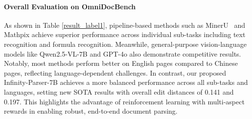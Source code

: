 \paragraph{Overall Evaluation on OmniDocBench}
As shown in Table \ref{result_label1}, pipeline-based methods such as MinerU~\citep{MinerU} and Mathpix achieve superior performance across individual sub-tasks including text recognition and formula recognition. Meanwhile, general-purpose vision-language models like Qwen2.5-VL-7B and GPT-4o also demonstrate competitive results. Notably, most methods perform better on English pages compared to Chinese pages, reflecting language-dependent challenges. In contrast, our proposed Infinity-Parser-7B achieves a more balanced performance across all sub-tasks and languages, setting new SOTA results with overall edit distances of 0.141 and 0.197. This highlights the advantage of reinforcement learning with multi-aspect rewards in enabling robust, end-to-end document parsing.










 



